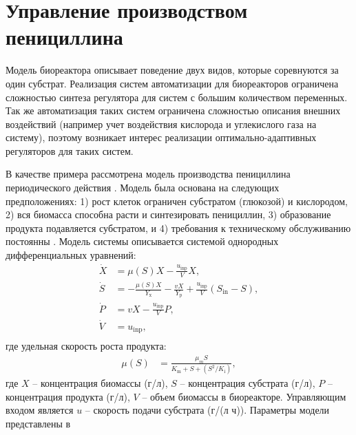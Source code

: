 %
\section{Управление производством пенициллина}\label{ch3:sec2}
%
Модель биореактора описывает поведение двух видов, которые соревнуются за один субстрат. Реализация систем автоматизации для биореакторов ограничена сложностью синтеза регулятора для систем с большим количеством переменных. Так же автоматизация таких систем ограничена сложностью описания внешних воздействий (например учет воздействия кислорода и углекислого газа на систему), поэтому возникает интерес реализации оптимально-адаптивных регуляторов для таких систем.

В качестве примера рассмотрена модель производства пенициллина  периодического действия \cite{bajpai1980mechanistic}.
Модель была основана на следующих предположениях: 1) рост клеток ограничен субстратом (глюкозой) и кислородом, 2) вся биомасса способна расти и синтезировать пенициллин, 3) образование продукта подавляется субстратом, и 4) требования к техническому обслуживанию постоянны \cite{patnaik2001penicillin}. Модель системы описывается системой однородных дифференциальных уравнений:
%
\begin{equation}\label{eq:penicilin}
\begin{split}
\dot{X} &=\mu(S)X-\frac{u_{\text{inp}}}{V}X,\\
\dot{S} &=-\frac{\mu(S)X}{Y_{\text{x}}}-\frac{vX}{Y_{\text{p}}}+\frac{u_{\text{inp}}}{V}(S_{\text{in}}-S),\\
\dot{P} &=vX-\frac{u_{\text{inp}}}{V}P,\\
\dot{V} &=u_{\text{inp}},\\
\end{split}
\end{equation}
где удельная скорость роста продукта:
\begin{align*}
	\mu(S)&=\frac{\mu_m S}{K_{\text{m}}+S+(S^2/K_{\text{i}})},
\end{align*}
где $X$ -- концентрация биомассы (г/л), $S$ -- концентрация субстрата (г/л), $P$ -- концентрация продукта (г/л), $V$ -- объем биомассы в биореакторе. Управляющим входом является $u$ -- скорость подачи субстрата (г/(л ч)). Параметры модели представлены в 
%
